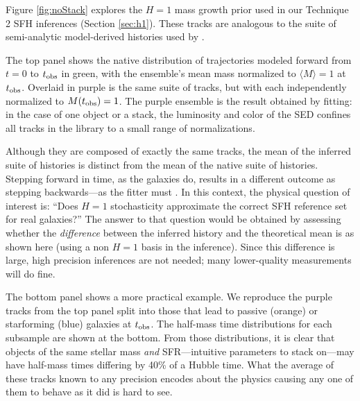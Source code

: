 \documentclass[a4paper,fleqn,usenatbib]{mnras}
\newcommand{\tobs}{t_{\rm obs}}
\begin{document}

Figure \ref{fig:noStack} explores the $H=1$ mass growth prior used in our Technique 2 SFH 
inferences (Section \ref{sec:h1}). These tracks are analogous to the suite of 
semi-analytic model-derived histories used by \citet{Pacifici12}. 

The top panel shows the native distribution of trajectories modeled forward 
from $t=0$ to $\tobs$ in green, with the ensemble's mean mass normalized to 
$\langle M\rangle=1$ at $\tobs$. Overlaid in purple is the same suite of tracks, but with
each independently normalized to $M(\tobs)=1$. The purple ensemble is the result obtained
by fitting: in the case of one object or a stack, the luminosity and color of the SED confines 
all tracks in the library to a small range of normalizations. 


Although they are composed of exactly the same tracks, the mean of the inferred suite of histories 
is distinct from the mean of the native suite of histories. Stepping forward in time, as the galaxies do, 
results in a different outcome as stepping backwards---as the fitter must 
\citep[see also][]{Behroozi13a, Torrey17}. In this context, the physical question of interest is: 
``Does $H=1$ stochasticity approximate the correct SFH reference set for real galaxies?'' The 
answer to that question would be obtained by assessing whether the {\it difference} between the 
inferred history and the theoretical mean is as shown here (using a non $H=1$ basis in
the inference). Since this difference is large, high precision inferences are not needed; many 
lower-quality measurements will do fine.

The bottom panel shows a more practical example. We reproduce the purple tracks from the top panel split 
into those that lead to passive (orange) or starforming (blue) galaxies at $\tobs$. 
The half-mass time distributions for each subsample are shown at the bottom. From those distributions, 
it is clear that objects of the same stellar mass {\it and} SFR---intuitive parameters to stack on---may have 
half-mass times differing by 40\% of a Hubble time. What the average of these tracks known to any 
precision encodes about the physics causing any one of them to behave as it did is hard to see.
\end{document}
